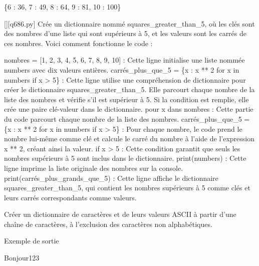 \{6 : 36, 7 : 49, 8 : 64, 9 : 81, 10 : 100\}
        \par
        \begin{solution}
            \renewcommand{\nomfichier}{q686.py}
            \pythonfile{\chemincode \nomfichier}[][\nomfichier]
            Crée un dictionnaire nommé squares\_greater\_than\_5, où les clés sont des nombres d'une liste qui sont supérieurs à 5, et les valeurs sont les carrés de ces nombres. Voici comment fonctionne le code :

    nombres = [1, 2, 3, 4, 5, 6, 7, 8, 9, 10] : Cette ligne initialise une liste nommée numbers avec dix valeurs entières.
    carrés\_plus\_que\_5 = \{x : x ** 2 for x in numbers if x > 5\} : Cette ligne utilise une compréhension de dictionnaire pour créer le dictionnaire squares\_greater\_than\_5. Elle parcourt chaque nombre de la liste des nombres et vérifie s'il est supérieur à 5. Si la condition est remplie, elle crée une paire clé-valeur dans le dictionnaire.
        pour x dans nombres : Cette partie du code parcourt chaque nombre de la liste des nombres.
        carrés\_plus\_que\_5 = \{x : x ** 2 for x in numbers if x > 5\} : Pour chaque nombre, le code prend le nombre lui-même comme clé et calcule le carré du nombre à l'aide de l'expression x ** 2, créant ainsi la valeur.
        if x > 5 : Cette condition garantit que seuls les nombres supérieurs à 5 sont inclus dans le dictionnaire.
    print(numbers) : Cette ligne imprime la liste originale des nombres sur la console.
    print(carrés\_plus\_grands\_que\_5) : Cette ligne affiche le dictionnaire squares\_greater\_than\_5, qui contient les nombres supérieurs à 5 comme clés et leurs carrés correspondants comme valeurs.
        \end{solution}
        

        \question
        Créer un dictionnaire de caractères et de leurs valeurs ASCII à partir d'une chaîne de caractères, à l'exclusion des caractères non alphabétiques.

Exemple de sortie

Bonjour123

